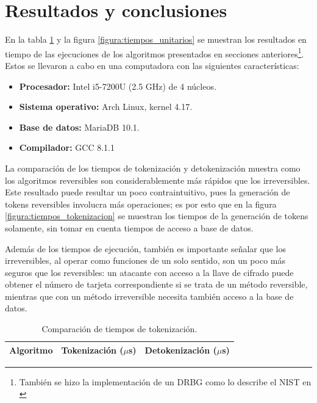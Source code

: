 %
%
%

\section{Resultados y conclusiones}

En la tabla \ref{tabla:tiempos_tokenizacion} y la figura
\ref{figura:tiempos_unitarios} se muestran los resultados en tiempo de
las ejecuciones de los algoritmos presentados en secciones
anteriores\footnote{También se hizo la implementación de un DRBG como lo
describe el NIST en \cite{nist_aleatorios}}. Estos se llevaron a cabo en una
computadora con las siguientes características:

\begin{itemize}
  \item \textbf{Procesador:} Intel i5-7200U (2.5 GHz) de 4 núcleos.
  \item \textbf{Sistema operativo:} Arch Linux, kernel 4.17.
  \item \textbf{Base de datos:} MariaDB 10.1.
  \item \textbf{Compilador:} GCC 8.1.1
\end{itemize}

La comparación de los tiempos de tokenización y detokenización muestra como los
algoritmos reversibles son considerablemente más rápidos que los irreversibles.
Este resultado puede resultar un poco contraintuitivo, pues la generación de
tokens reversibles involucra más operaciones; es por esto que en la figura
\ref{figura:tiempos_tokenizacion} se muestran los tiempos de la generación de
tokens solamente, sin tomar en cuenta tiempos de acceso a base de datos.

Además de los tiempos de ejecución, también es importante señalar que los
irreversibles, al operar como funciones de un solo sentido, son un poco más
seguros que los reversibles: un atacante con acceso a la llave de cifrado puede
obtener el número de tarjeta correspondiente si se trata de un método
reversible, mientras que con un método irreversible necesita también acceso a la
base de datos.

\begin{table}
  \centering
  \caption{Comparación de tiempos de tokenización.}
  \label{tabla:tiempos_tokenizacion}
  \begin{tabular}{c|c|c}
    \hline
    Algoritmo & Tokenización ($\mu$s) & Detokenización ($\mu$s) \\
    \hline
    
  \end{tabular}
\end{table}

